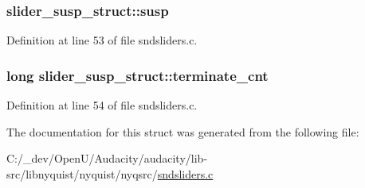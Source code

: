 \subsubsection[{\texorpdfstring{susp}{susp}}]{ slider\+\_\+susp\+\_\+struct\+::susp}\hypertarget{structslider__susp__struct_aa91890d9674d9b05523fcd72d8fd41e9}{}\label{structslider__susp__struct_aa91890d9674d9b05523fcd72d8fd41e9}


Definition at line 53 of file sndsliders.\+c.

\subsubsection[{\texorpdfstring{terminate\+\_\+cnt}{terminate_cnt}}]{\setlength{\rightskip}{0pt plus 5cm}long slider\+\_\+susp\+\_\+struct\+::terminate\+\_\+cnt}\hypertarget{structslider__susp__struct_afb6e303d2494ef01bb2a6e29f41830d6}{}\label{structslider__susp__struct_afb6e303d2494ef01bb2a6e29f41830d6}


Definition at line 54 of file sndsliders.\+c.



The documentation for this struct was generated from the following file\+:\begin{DoxyCompactItemize}
\item 
C\+:/\+\_\+dev/\+Open\+U/\+Audacity/audacity/lib-\/src/libnyquist/nyquist/nyqsrc/\hyperlink{sndsliders_8c}{sndsliders.\+c}\end{DoxyCompactItemize}
